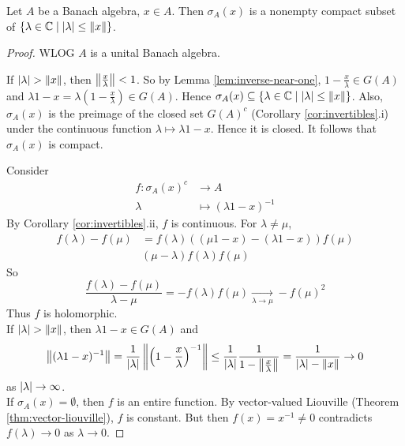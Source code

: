 \documentclass{article}
\begin{document}
\begin{thm}\label{thm:spectrum-nonempty}
  Let $A$ be a Banach algebra, $x \in A$. Then $\sigma_A(x)$ is a nonempty compact subset of $\{\lambda \in \mathbb C \mid \left\lvert \lambda\right\rvert \le \left\lVert x\right\rVert\}$.
\end{thm}
\begin{proof}
  WLOG $A$ is a unital Banach algebra.

  If $\left\lvert \lambda\right\rvert > \left\lVert x\right\rVert$, then $\left\lVert \frac x\lambda\right\rVert < 1$. So by Lemma \ref{lem:inverse-near-one}, $1 - \frac x\lambda \in G(A)$ and $\lambda1 - x = \lambda\left(1 - \frac x\lambda\right) \in G(A)$. Hence $\sigma_A(x) \subseteq \{\lambda \in \mathbb C \mid \left\lvert \lambda\right\rvert \le \left\lVert x\right\rVert\}$. Also, $\sigma_A(x)$ is the preimage of the closed set $G(A)^c$ (Corollary \ref{cor:invertibles}.i) under the continuous function $\lambda \mapsto \lambda1 - x$. Hence it is closed. It follows that $\sigma_A(x)$ is compact.

  Consider
  \begin{align*}
    f : \sigma_A(x)^c & \to A \\
    \lambda & \mapsto (\lambda 1 - x)^{-1}
  \end{align*}
  By Corollary \ref{cor:invertibles}.ii, $f$ is continuous. For $\lambda \ne \mu$,
  \begin{align*}
    f(\lambda) - f(\mu)
    & = f(\lambda)((\mu 1 - x) - (\lambda 1 - x))f(\mu) \\
    & (\mu - \lambda)f(\lambda)f(\mu)
  \end{align*}
  So
  $$\frac{f(\lambda) - f(\mu)}{\lambda - \mu} = -f(\lambda)f(\mu) \underset{\lambda \to \mu}\to -f(\mu)^2$$
  Thus $f$ is holomorphic. \\
  If $\left\lvert \lambda\right\rvert > \left\lVert x\right\rVert$, then $\lambda 1 - x \in G(A)$ and
  $$\left\lVert (\lambda 1 - x)^{-1}\right\rVert = \frac 1{\left\lvert \lambda\right\rvert}\left\lVert \left(1 - \frac x\lambda\right)^{-1}\right\rVert \le \frac 1{\left\lvert \lambda\right\rvert}\frac 1{1 - \left\lVert \frac x\lambda\right\rVert} = \frac 1{\left\lvert \lambda\right\rvert - \left\lVert x\right\rVert} \to 0$$
  as $\left\lvert \lambda\right\rvert \to \infty$. \\
  If $\sigma_A(x) = \emptyset$, then $f$ is an entire function. By vector-valued Liouville (Theorem \ref{thm:vector-liouville}), $f$ is constant. But then $f(x) = x^{-1} \ne 0$ contradicts $f(\lambda) \to 0$ as $\lambda \to 0$.
\end{proof}
\end{document}
